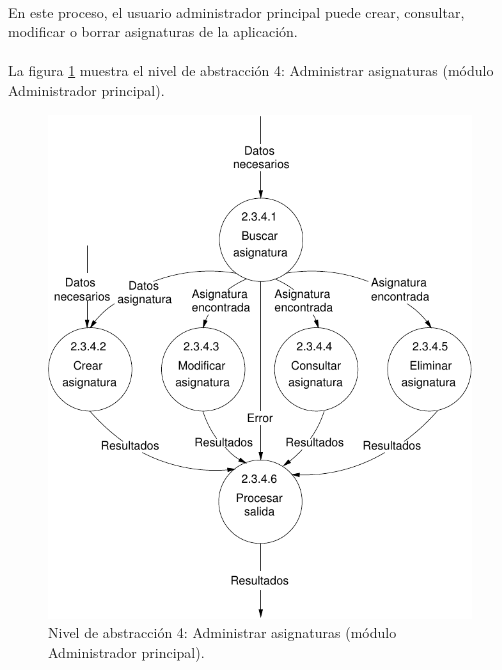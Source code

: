 \paragraph{}En este proceso, el usuario administrador principal puede crear,
consultar, modificar o borrar asignaturas de la aplicación.

\paragraph{}La figura \ref{diagramaNivel4-AdministrarAsignaturas}
muestra el nivel de abstracción 4: Administrar asignaturas (módulo Administrador
principal).

  \begin{figure}[!ht]
    \begin{center}
      \includegraphics[]{08.Analisis_Funcional/8.2.DFDs/Niveles/Nivel4/AdministradorPrincipal/AdministrarAsignaturas/Diagramas/nivel4-AdministrarAsignaturas.pdf}
      \caption{Nivel de abstracción 4: Administrar asignaturas (módulo Administrador principal).}
      \label{diagramaNivel4-AdministrarAsignaturas}
    \end{center}
  \end{figure}
